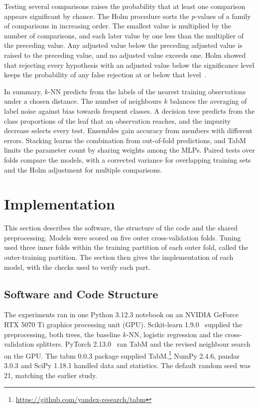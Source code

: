 \documentclass[conference]{IEEEtran}
\newcommand{\knn}{\mbox{$k$-NN}}
\begin{document}
Testing several comparisons raises the probability that at least one comparison appears significant by chance. The Holm procedure sorts the $p$-values of a family of comparisons in increasing order. The smallest value is multiplied by the number of comparisons, and each later value by one less than the multiplier of the preceding value. Any adjusted value below the preceding adjusted value is raised to the preceding value, and no adjusted value exceeds one. Holm showed that rejecting every hypothesis with an adjusted value below the significance level keeps the probability of any false rejection at or below that level~\cite{holm1979}.

In summary, \knn{} predicts from the labels of the nearest training observations under a chosen distance. The number of neighbours $k$ balances the averaging of label noise against bias towards frequent classes. A decision tree predicts from the class proportions of the leaf that an observation reaches, and the impurity decrease selects every test. Ensembles gain accuracy from members with different errors. Stacking learns the combination from out-of-fold predictions, and TabM limits the parameter count by sharing weights among the MLPs. Paired tests over folds compare the models, with a corrected variance for overlapping training sets and the Holm adjustment for multiple comparisons.

\section{Implementation}
This section describes the software, the structure of the code and the shared preprocessing. Models were scored on five outer cross-validation folds. Tuning used three inner folds within the training partition of each outer fold, called the outer-training partition. The section then gives the implementation of each model, with the checks used to verify each part.

\subsection{Software and Code Structure}
The experiments ran in one Python 3.12.3 notebook on an NVIDIA GeForce RTX 5070 Ti graphics processing unit (GPU). Scikit-learn 1.9.0~\cite{pedregosa2011} supplied the preprocessing, both trees, the baseline \knn{}, logistic regression and the cross-validation splitters. PyTorch 2.13.0~\cite{paszke2019} ran TabM and the revised neighbour search on the GPU. The tabm 0.0.3 package supplied TabM.\footnote{\url{https://github.com/yandex-research/tabm}} NumPy 2.4.6, pandas 3.0.3 and SciPy 1.18.1 handled data and statistics. The default random seed was 21, matching the earlier study.
\end{document}
